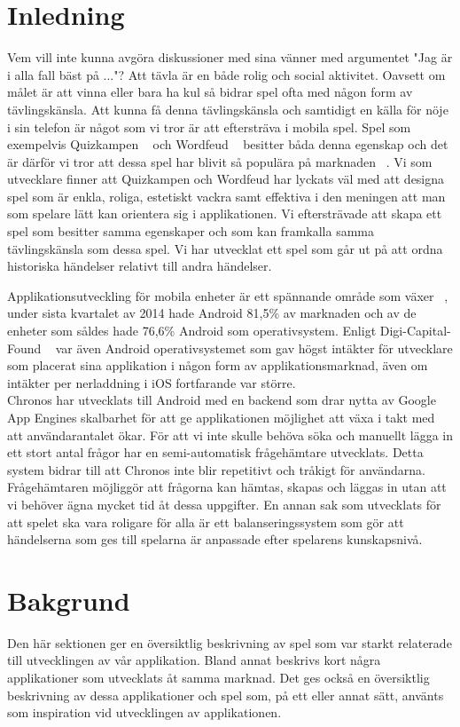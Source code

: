 \documentclass[a4paper, 11pt]{article}
\begin{document}
\section{Inledning}
Vem vill inte kunna avgöra diskussioner med sina vänner med argumentet "Jag är i alla fall bäst på ..."? 
Att tävla är en både rolig och social aktivitet. Oavsett om målet är att vinna eller bara ha kul så bidrar spel ofta med någon form av tävlingskänsla. Att kunna få denna tävlingskänsla och samtidigt en källa för nöje i sin telefon är något som vi tror är att eftersträva i mobila spel. Spel som exempelvis Quizkampen ~\cite{quiz} och Wordfeud ~\cite{wordfeud} besitter båda denna egenskap och det är därför vi tror att dessa spel har blivit så populära på marknaden ~\cite{appsalesrating}. Vi som utvecklare finner att Quizkampen och Wordfeud har lyckats väl med att designa spel som är enkla, roliga, estetiskt vackra samt effektiva i den meningen att man som spelare lätt kan orientera sig i applikationen. Vi eftersträvade att skapa ett spel som besitter samma egenskaper och som kan framkalla samma tävlingskänsla som dessa spel. Vi har utvecklat ett spel som går ut på att ordna historiska händelser relativt till andra händelser. 

Applikationsutveckling för mobila enheter är ett spännande område som växer ~\cite{IDC}, under sista kvartalet av 2014 hade Android 81,5\% av marknaden och av de enheter som såldes hade 76,6\% Android som operativsystem. Enligt Digi-Capital-Found ~\cite{revenue} var även Android operativsystemet som gav högst intäkter för utvecklare som placerat sina applikation i någon form av applikationsmarknad, även om intäkter per nerladdning i iOS fortfarande var större. \\

Chronos har utvecklats till Android med en backend som drar nytta av Google App Engines skalbarhet för att ge applikationen möjlighet att växa i takt med att användarantalet ökar. För att vi inte skulle behöva söka och manuellt lägga in ett stort antal frågor har en semi-automatisk frågehämtare utvecklats. Detta system bidrar till att Chronos inte blir repetitivt och tråkigt för användarna. Frågehämtaren möjliggör att frågorna kan hämtas, skapas och läggas in utan att vi behöver ägna mycket tid åt dessa uppgifter. En annan sak som utvecklats för att spelet ska vara roligare för alla är ett balanseringssystem som gör att händelserna som ges till spelarna är anpassade efter spelarens kunskapsnivå.


\section{Bakgrund}
Den här sektionen ger en översiktlig beskrivning av spel som var starkt relaterade till utvecklingen av vår applikation. Bland annat beskrivs kort några applikationer som utvecklats åt samma marknad. Det ges också en översiktlig beskrivning av dessa applikationer och spel som, på ett eller annat sätt, använts som inspiration vid utvecklingen av applikationen. 
\end{document}
